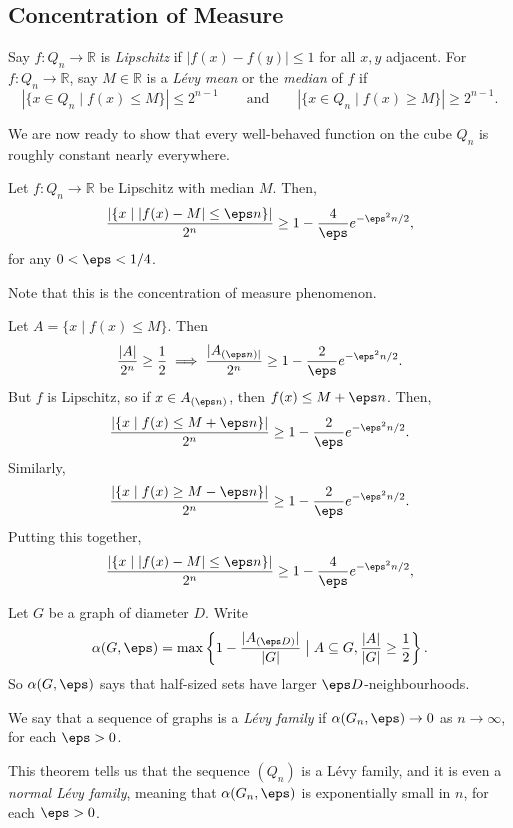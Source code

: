 \documentclass[12pt]{article}
\begin{document}
\subsection{Concentration of Measure}%
\label{sub:conc_m}

Say $f : Q_n \to \mathbb{R}$ is \emph{Lipschitz} if $|f(x) - f(y)| \leq 1$ for all $x, y$ adjacent. For $f : Q_n \to \mathbb{R}$, say $M \in \mathbb{R}$ is a \emph{L\'evy mean} or the \emph{median} of $f$ if
\[
	|\{x \in Q_n \mid f(x) \leq M\}| \leq 2^{n-1} \qquad \text{and} \qquad |\{x \in Q_n \mid f(x) \geq M\}| \geq 2^{n-1}.
\]

We are now ready to show that every well-behaved function on the cube $Q_n$ is roughly constant nearly everywhere.

\begin{theorem}
	Let $f: Q_n \to \mathbb{R}$ be Lipschitz with median $M$. Then,
	\[
		\frac{|\{x \mid |f(x) - M| \leq \eps n\}|}{2^{n}} \geq 1 - \frac{4}{\eps} e^{-\eps^2n/2},
	\]
	for any $0 < \eps < 1/4$.
\end{theorem}

Note that this is the concentration of measure phenomenon.

\begin{proofbox}
	Let $A = \{x \mid f(x) \leq M\}$. Then
	\[
	\frac{|A|}{2^{n}} \geq \frac{1}{2} \implies \frac{|A_{(\eps n)|}}{2^{n}} \geq 1 - \frac{2}{\eps} e^{-\eps^2n/2}.
	\]
	But $f$ is Lipschitz, so if $x \in A_{(\eps n)}$, then $f(x) \leq M + \eps n$. Then,
	\[
		\frac{|\{x \mid f(x) \leq M + \eps n\}|}{2^{n}} \geq 1 - \frac{2}{\eps} e^{-\eps^2n/2}.
	\]
	Similarly,
	\[
		\frac{|\{x \mid f(x) \geq M - \eps n\}|}{2^{n}} \geq 1 - \frac{2}{\eps} e^{-\eps^2n/2}.
	\]
	Putting this together,
	\[
		\frac{|\{x \mid |f(x) - M| \leq \eps n\}|}{2^{n}} \geq 1 - \frac{4}{\eps} e^{-\eps^2n/2},
	\]
\end{proofbox}

Let $G$ be a graph of diameter $D$. Write
\[
\alpha(G, \eps) = \max \left\{ 1 - \frac{|A_{(\eps D)}|}{|G|} \bigm| A \subseteq G, \frac{|A|}{|G|} \geq \frac{1}{2} \right\}.
\]
So $\alpha(G, \eps)$ says that half-sized sets have larger $\eps D$-neighbourhoods.

We say that a sequence of graphs is a \emph{L\'evy family} if $\alpha(G_n, \eps) \to 0$ as $n \to \infty$, for each $\eps > 0$.

This theorem tells us that the sequence $(Q_n)$ is a L\'evy family, and it is even a \emph{normal L\'evy family}, meaning that $\alpha(G_n, \eps)$ is exponentially small in $n$, for each $\eps > 0$.
\end{document}
